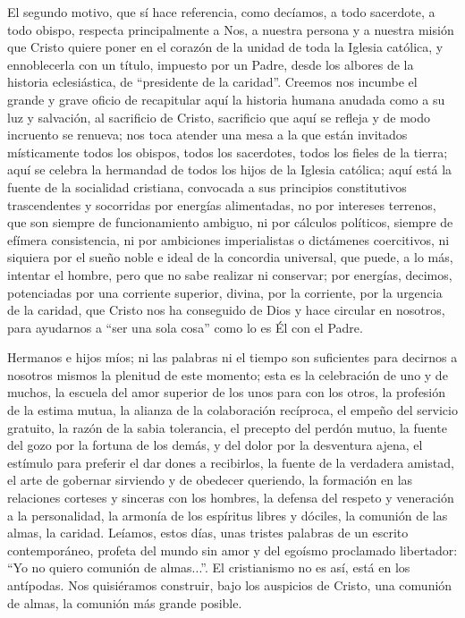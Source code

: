 			\begin{body}El segundo motivo, que sí hace referencia, como decíamos, a todo sacerdote, a todo obispo, respecta principalmente a Nos, a nuestra persona y a nuestra misión que Cristo quiere poner en el corazón de la unidad de toda la Iglesia católica, y ennoblecerla con un título, impuesto por un Padre, desde los albores de la historia eclesiástica, de “presidente de la caridad”. Creemos nos incumbe el grande y grave oficio de recapitular aquí la historia humana anudada como a su luz y salvación, al sacrificio de Cristo, sacrificio que aquí se refleja y de modo incruento se renueva; nos toca atender una mesa a la que están invitados místicamente todos los obispos, todos los sacerdotes, todos los fieles de la tierra; aquí se celebra la hermandad de todos los hijos de la Iglesia católica; aquí está la fuente de la socialidad cristiana, convocada a sus principios constitutivos trascendentes y socorridas por energías alimentadas, no por intereses terrenos, que son siempre de funcionamiento ambiguo, ni por cálculos políticos, siempre de efímera consistencia, ni por ambiciones imperialistas o dictámenes coercitivos, ni siquiera por el sueño noble e ideal de la concordia universal, que puede, a lo más, intentar el hombre, pero que no sabe realizar ni conservar; por energías, decimos, potenciadas por una corriente superior, divina, por la corriente, por la urgencia de la caridad, que Cristo nos ha conseguido de Dios y hace circular en nosotros, para ayudarnos a “ser una sola cosa” como lo es Él con el Padre.\end{body}
			
			\begin{body}Hermanos e hijos míos; ni las palabras ni el tiempo son suficientes para decirnos a nosotros mismos la plenitud de este momento; esta es la celebración de uno y de muchos, la escuela del amor superior de los unos para con los otros, la profesión de la estima mutua, la alianza de la colaboración recíproca, el empeño del servicio gratuito, la razón de la sabia tolerancia, el precepto del perdón mutuo, la fuente del gozo por la fortuna de los demás, y del dolor por la desventura ajena, el estímulo para preferir el dar dones a recibirlos, la fuente de la verdadera amistad, el arte de gobernar sirviendo y de obedecer queriendo, la formación en las relaciones corteses y sinceras con los hombres, la defensa del respeto y veneración a la personalidad, la armonía de los espíritus libres y dóciles, la comunión de las almas, la caridad. Leíamos, estos días, unas tristes palabras de un escrito contemporáneo, profeta del mundo sin amor y del egoísmo proclamado libertador: “Yo no quiero comunión de almas...”. El cristianismo no es así, está en los antípodas. Nos quisiéramos construir, bajo los auspicios de Cristo, una comunión de almas, la comunión más grande posible.\end{body}
			
